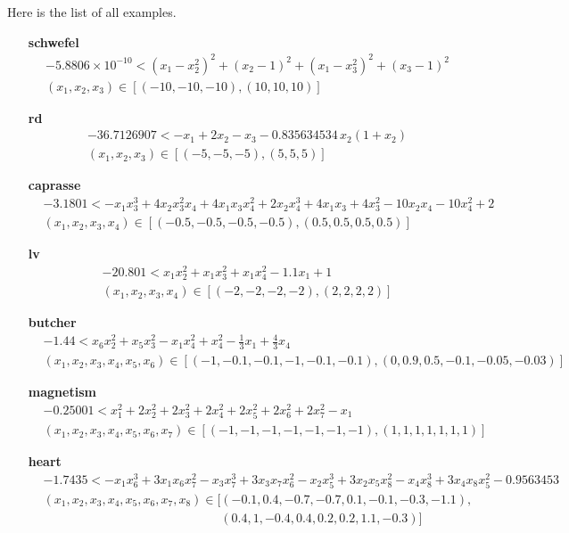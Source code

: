 \documentclass[a4paper]{article}
\begin{document}
Here is the list of all examples.
\begin{itemize}
\item[\bf schwefel]
\begin{eqnarray*}
&-5.8806 \times 10^{-10} < (x_1 - x_2^2)^2 + (x_2 - 1)^2 + (x_1 - x_3^2)^2 + (x_3 - 1)^2\\
&(x_1, x_2, x_3) \in [(-10,-10,-10),(10,10,10)]
\end{eqnarray*}

\item[\bf rd]
\begin{eqnarray*}
&-36.7126907 < -x_1 + 2 x_2 - x_3 - 0.835634534\, x_2 (1 + x_2)\\
&(x_1, x_2, x_3) \in [(-5,-5,-5),(5,5,5)]
\end{eqnarray*}

\item[\bf caprasse]
\begin{eqnarray*}
&-3.1801 < -x_1 x_3^3 + 4 x_2 x_3^2 x_4 + 4 x_1 x_3 x_4^2 + 2 x_2 x_4^3 + 4 x_1 x_3 + 4 x_3^2 - 10 x_2 x_4 - 10 x_4^2 + 2\\
&(x_1, x_2, x_3, x_4) \in [(-0.5,-0.5,-0.5,-0.5),(0.5,0.5,0.5,0.5)]
\end{eqnarray*}

\item[\bf lv]
\begin{eqnarray*}
&-20.801 < x_1 x_2^2 + x_1 x_3^2 + x_1 x_4^2 - 1.1 x_1 + 1\\
&(x_1, x_2, x_3, x_4) \in [(-2,-2,-2,-2), (2,2,2,2)]
\end{eqnarray*}

\item[\bf butcher]
\begin{eqnarray*}
&-1.44 < x_6 x_2^2 + x_5 x_3^2 - x_1 x_4^2 + x_4^2 - \frac{1}{3} x_1 + \frac{4}{3} x_4\\
&(x_1, x_2, x_3, x_4, x_5, x_6) \in [(-1,-0.1, -0.1, -1, -0.1, -0.1), (0,0.9,0.5,-0.1,-0.05,-0.03)]
\end{eqnarray*}

\item[\bf magnetism]
\begin{eqnarray*}
&-0.25001 < x_1^2 + 2 x_2^2 + 2 x_3^2 + 2 x_4^2 + 2 x_5^2 + 2 x_6^2 + 2 x_7^2 - x_1\\
&(x_1,x_2,x_3,x_4,x_5,x_6,x_7) \in [(-1,-1,-1,-1,-1,-1,-1), (1,1,1,1,1,1,1)]
\end{eqnarray*}

\item[\bf heart]
\begin{equation*}
\begin{split}
&-1.7435 < -x_1 x_6^3 + 3 x_1 x_6 x_7^2 - x_3 x_7^3 + 3 x_3 x_7 x_6^2 - x_2 x_5^3 + 3 x_2 x_5 x_8^2 - x_4 x_8^3 + 3 x_4 x_8 x_5^2 - 0.9563453\\
&(x_1,x_2,x_3,x_4,x_5,x_6,x_7,x_8) \in [(-0.1, 0.4, -0.7, -0.7, 0.1, -0.1, -0.3, -1.1),\\ &\phantom{(x_1,x_2,x_3,x_4,x_5,x_6,x_7,x_8) \in [ }(0.4, 1, -0.4, 0.4, 0.2, 0.2, 1.1, -0.3)]
\end{split}
\end{equation*}
\end{itemize}
\end{document}
